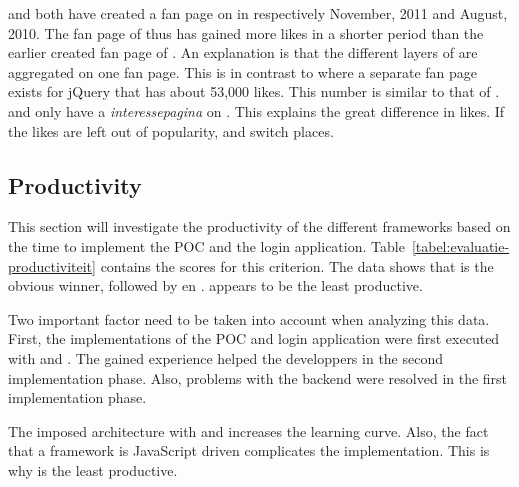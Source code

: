 \documentclass[a4paper]{artikel3}
\newcommand{\term}[1]{\emph{#1}}
\begin{document}
\kendob{} and \jqma{} both have created a fan page on \fb{} in respectively November, 2011 and August, 2010.
The fan page of \kendob{} thus has gained more \fb{} likes in a shorter period than the earlier created fan page of \jqma{}.
An explanation is that the different layers of \kendo{} are aggregated on one fan page.
This is in contrast to \jqma{} where a separate fan page exists for jQuery that has about 53,000 likes.
This number is similar to that of \kendo{}.
\sta{} and \lungo{} only have a \term{interessepagina} on \fb.
This explains the great difference in \fb{} likes.
If the likes are left out of popularity, \kendob{} and \jqma{} switch places.


\subsection{Productivity} %
\label{sec:evaluation-productivity}


This section will investigate the productivity of the different frameworks based on the time to implement the POC and the login application.
Table~\ref{tabel:evaluatie-productiviteit} contains the scores for this criterion.
The data shows that \lungo{} is the obvious winner,  followed by \kendo{} en \jqm{}.
\st{} appears to be the least productive.

Two important factor need to be taken into account when analyzing this data.
First,  the implementations of the POC and login application were first executed with \jqm{} and \st{}.
The gained experience helped the developpers in the second implementation phase.
Also,  problems with the backend were resolved in the first implementation phase.

The imposed architecture with \st{} and \kendo{} increases the learning curve.
Also, the fact that a framework is JavaScript driven complicates the implementation.
This is why \st{} is the least productive.
\end{document}
